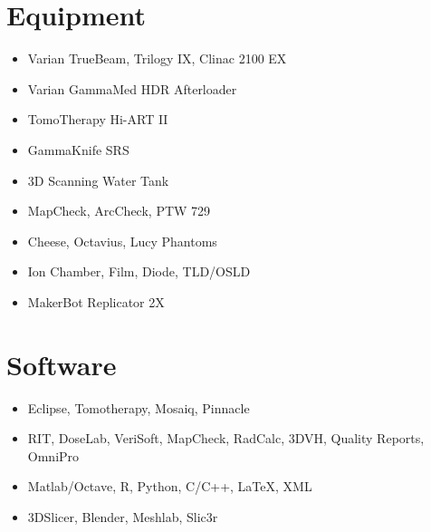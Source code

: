 \documentclass{tccv-grey}
\begin{document}
\section{Equipment}
\begin{itemize}[noitemsep]
    \item Varian TrueBeam, Trilogy IX, Clinac 2100 EX
    \item Varian GammaMed HDR Afterloader
    \item TomoTherapy Hi-ART II
    \item GammaKnife SRS
    \item 3D Scanning Water Tank
    \item MapCheck, ArcCheck, PTW 729
    \item Cheese, Octavius, Lucy Phantoms
    \item Ion Chamber, Film, Diode, TLD/OSLD
    \item MakerBot Replicator 2X
\end{itemize}

\section{Software}
\begin{itemize}[noitemsep]
    \item Eclipse, Tomotherapy, Mosaiq, Pinnacle
    \item RIT, DoseLab, VeriSoft, MapCheck, RadCalc, 3DVH, Quality Reports, OmniPro
    \item Matlab/Octave, R, Python, C/C++, LaTeX, XML
    \item 3DSlicer, Blender, Meshlab, Slic3r
\end{itemize}
\end{document}
